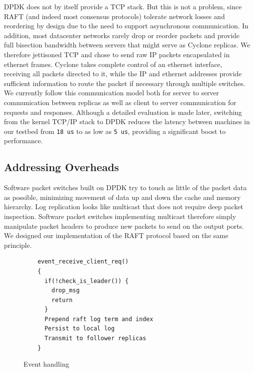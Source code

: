 \documentclass[twocolumn]{article}
\begin{document}
DPDK does not by itself provide a TCP stack. But this is not a problem, since
RAFT (and indeed most consensus protocols) tolerate network losses and
reordering by design due to the need to support asynchronous communication. In
addition, most datacenter networks rarely drop or reorder packets and provide
full bisection bandwidth between servers that might serve as Cyclone replicas. We
therefore jettisoned TCP and chose to send raw IP packets encapsulated in
ethernet frames. Cyclone takes complete control of an ethernet interface,
receiving all packets directed to it, while the IP and ethernet addresses
provide sufficient information to route the packet if necessary through multiple
switches. We currently follow this communication model both for server to server
communication between replicas as well as client to server communication for
requests and responses. Although a detailed evaluation is made later, switching
from the kernel TCP/IP stack to DPDK reduces the latency between machines in our
testbed from {\tt 18 us} to as low as {\tt 5 us}, providing a significant boost
to performance.

\subsection{Addressing Overheads}
\label{sec:dm}
Software packet switches built on DPDK try to touch as little of the packet data
as possible, minimizing movement of data up and down the cache and memory
hierarchy. Log replication looks like multicast that does not require deep
packet inspection. Software packet switches implementing multicast therefore
simply manipulate packet headers to produce new packets to send on the output
ports. We designed our implementation of the RAFT protocol based on the same
principle.

\begin{figure}
\small
\begin{verbatim}
    event_receive_client_req()
    {
      if(!check_is_leader()) {
        drop_msg
        return
      }
      Prepend raft log term and index
      Persist to local log
      Transmit to follower replicas
    }
\end{verbatim}
\caption{Event handling}
\label{fig:control_plane}
\end{figure}
\end{document}
